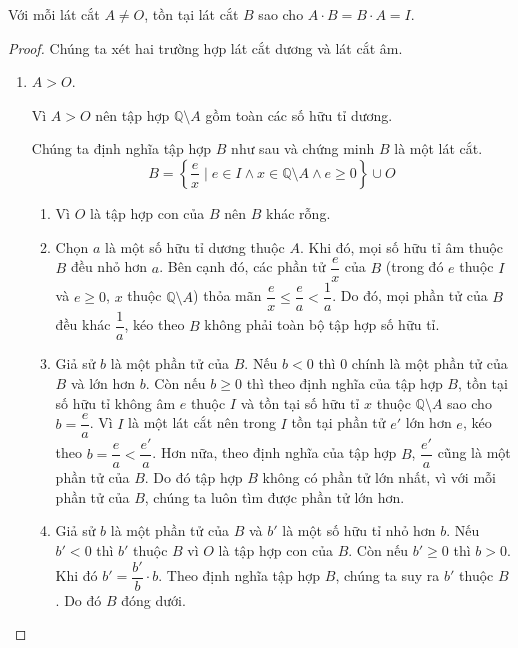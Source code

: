 \begin{theorem}
    Với mỗi lát cắt $A\ne O$, tồn tại lát cắt $B$ sao cho $A\cdot B = B\cdot A = I$.
\end{theorem}

\begin{proof}
    Chúng ta xét hai trường hợp lát cắt dương và lát cắt âm.
    \begin{enumerate}[label={\textbf{Trường hợp \arabic*.}},itemindent=2cm]
        \item $A > O$.

              Vì $A > O$ nên tập hợp $\mathbb{Q}\setminus A$ gồm toàn các số hữu tỉ dương.

              Chúng ta định nghĩa tập hợp $B$ như sau và chứng minh $B$ là một lát cắt.
              \[
                  B = \left\{ \frac{e}{x} \mid e\in I \wedge x\in \mathbb{Q}\setminus A\wedge e\geq 0 \right\}\cup O
              \]

              \begin{enumerate}[label={(DC\arabic*)}]
                  \item Vì $O$ là tập hợp con của $B$ nên $B$ khác rỗng.
                  \item Chọn $a$ là một số hữu tỉ dương thuộc $A$. Khi đó, mọi số hữu tỉ âm thuộc $B$ đều nhỏ hơn $a$. Bên cạnh đó, các phần tử $\dfrac{e}{x}$ của $B$ (trong đó $e$ thuộc $I$ và $e\geq 0$, $x$ thuộc $\mathbb{Q}\setminus A$) thỏa mãn $\dfrac{e}{x}\leq \dfrac{e}{a} < \dfrac{1}{a}$. Do đó, mọi phần tử của $B$ đều khác $\dfrac{1}{a}$, kéo theo $B$ không phải toàn bộ tập hợp số hữu tỉ.
                  \item Giả sử $b$ là một phần tử của $B$. Nếu $b < 0$ thì $0$ chính là một phần tử của $B$ và lớn hơn $b$. Còn nếu $b\geq 0$ thì theo định nghĩa của tập hợp $B$, tồn tại số hữu tỉ không âm $e$ thuộc $I$ và tồn tại số hữu tỉ $x$ thuộc $\mathbb{Q}\setminus A$ sao cho $b = \dfrac{e}{a}$. Vì $I$ là một lát cắt nên trong $I$ tồn tại phần tử $e'$ lớn hơn $e$, kéo theo $b = \dfrac{e}{a} < \dfrac{e'}{a}$. Hơn nữa, theo định nghĩa của tập hợp $B$, $\dfrac{e'}{a}$ cũng là một phần tử của $B$. Do đó tập hợp $B$ không có phần tử lớn nhất, vì với mỗi phần tử của $B$, chúng ta luôn tìm được phần tử lớn hơn.
                  \item Giả sử $b$ là một phần tử của $B$ và $b'$ là một số hữu tỉ nhỏ hơn $b$. Nếu $b' < 0$ thì $b'$ thuộc $B$ vì $O$ là tập hợp con của $B$. Còn nếu $b'\geq 0$ thì $b > 0$. Khi đó $b' = \dfrac{b'}{b}\cdot b$. Theo định nghĩa tập hợp $B$, chúng ta suy ra $b'$ thuộc $B$. Do đó $B$ đóng dưới.
              \end{enumerate}


\end{enumerate}
\end{proof}
